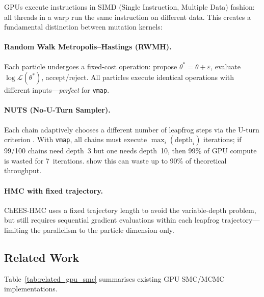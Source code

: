 \documentclass[11pt,a4paper]{article}
\begin{document}
GPUs execute instructions in SIMD (Single Instruction, Multiple Data)
fashion: all threads in a warp run the same instruction on different data.
This creates a fundamental distinction between mutation kernels:

\paragraph{Random Walk Metropolis--Hastings (RWMH).}
Each particle undergoes a fixed-cost operation: propose
$\theta^* = \theta + \varepsilon$, evaluate $\log\mathcal{L}(\theta^*)$,
accept/reject.  All particles execute identical operations with different
inputs---\emph{perfect} for \texttt{vmap}.

\paragraph{NUTS (No-U-Turn Sampler).}
Each chain adaptively chooses a different number of leapfrog steps via
the U-turn criterion \cite{Hoffman2014}.  With \texttt{vmap}, all chains
must execute $\max_i(\text{depth}_i)$ iterations; if 99/100 chains need
depth~3 but one needs depth~10, then 99\% of GPU compute is wasted for
7~iterations.  \cite{Dance2025} show this can waste up to 90\% of
theoretical throughput.

\paragraph{HMC with fixed trajectory.}
ChEES-HMC \cite{Hoffman2021} uses a fixed trajectory length to avoid
the variable-depth problem, but still requires sequential gradient
evaluations within each leapfrog trajectory---limiting the parallelism
to the particle dimension only.

\subsection{Related Work}

Table~\ref{tab:related_gpu_smc} summarises existing GPU SMC/MCMC implementations.
\end{document}
